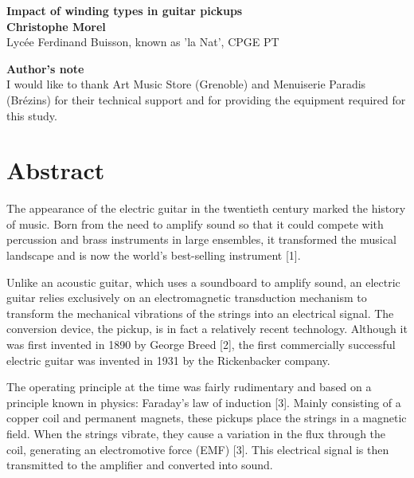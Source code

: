 \documentclass[11pt, a4paper]{article}
\begin{document}
\begin{titlepage}
    \vspace*{\fill}
    \begin{center}
        {\Huge \textbf{Impact of winding types in guitar pickups}} \\[2cm]
        {\Large \textbf{Christophe Morel}} \\[0.5cm]
        {\large Lycée Ferdinand Buisson, known as 'la Nat', CPGE PT} \\[3cm]
    \end{center}
    
    \textbf{Author's note} \\
    I would like to thank Art Music Store (Grenoble) and Menuiserie Paradis (Brézins) for their technical support and for providing the equipment required for this study.
    \vspace*{\fill}
\end{titlepage}

\newpage

\section*{Abstract}
The appearance of the electric guitar in the twentieth century marked the history of music. Born from the need to amplify sound so that it could compete with percussion and brass instruments in large ensembles, it transformed the musical landscape and is now the world's best-selling instrument [1].

Unlike an acoustic guitar, which uses a soundboard to amplify sound, an electric guitar relies exclusively on an electromagnetic transduction mechanism to transform the mechanical vibrations of the strings into an electrical signal. The conversion device, the pickup, is in fact a relatively recent technology. Although it was first invented in 1890 by George Breed [2], the first commercially successful electric guitar was invented in 1931 by the Rickenbacker company.

The operating principle at the time was fairly rudimentary and based on a principle known in physics: Faraday's law of induction [3]. Mainly consisting of a copper coil and permanent magnets, these pickups place the strings in a magnetic field. When the strings vibrate, they cause a variation in the flux through the coil, generating an electromotive force (EMF) [3]. This electrical signal is then transmitted to the amplifier and converted into sound.
\end{document}
